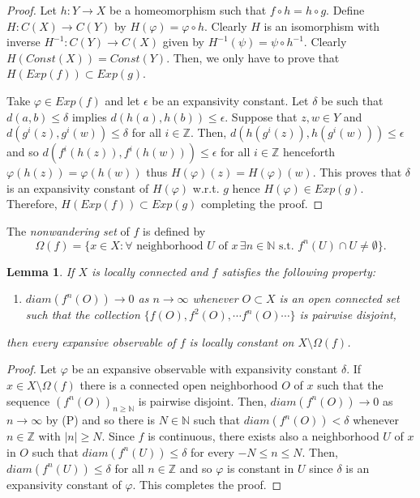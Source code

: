 \documentclass[11pt,letterpaper]{amsart}
\newtheorem{lem}{Lemma}
\begin{document}
\begin{proof}
Let $h:Y\to X$ be a homeomorphism such that
$f\circ h=h\circ g$.
Define $H:C(X)\to C(Y)$ by
$H(\varphi)=\varphi\circ h$.
Clearly $H$ is an isomorphism with inverse $H^{-1}:C(Y)\to C(X)$ given by $H^{-1}(\psi)=\psi\circ h^{-1}$.
Clearly $H(Const(X))=Const(Y)$.
Then, we only have to prove that $H(Exp(f))\subset Exp(g)$.

Take $\varphi\in Exp(f)$ and let $\epsilon$ be an expansivity constant.
Let $\delta$ be such that $d(a,b)\leq\delta$ implies
$d(h(a),h(b))\leq\epsilon$.
Suppose that $z,w\in Y$ and $d(g^i(z),g^i(w))\leq\delta$ for all $i\in\mathbb{Z}$.
Then, $d(h(g^i(z)),h(g^i(w)))\leq\epsilon$ and so
$d(f^i(h(z)),f^i(h(w)))\leq\epsilon$ for all $i\in\mathbb{Z}$
henceforth $\varphi(h(z))=\varphi(h(w))$ thus
$H(\varphi)(z)=H(\varphi)(w)$.
This proves that $\delta$ is an expansivity constant of $H(\varphi)$ w.r.t. $g$
hence $H(\varphi)\in Exp(g)$. Therefore, $H(Exp(f))\subset Exp(g)$ completing the proof.
\end{proof}

The {\em nonwandering set} of $f$ is defined by
$$
\Omega(f)=\{x\in X:\forall\mbox{ neighborhood }U \mbox{ of }x\, \exists n\in\mathbb{N}\mbox{ s.t. }f^n(U)\cap U\neq\emptyset\}.
$$





\begin{lem}
\label{ulrich}
If $X$ is locally connected and $f$ satisfies the following property:
\begin{enumerate}
\item[(P)]
$diam(f^n(O))\to0$ as $n\to\infty$ whenever $O\subset X$ is an open connected set such that the collection $\{f(O),f^2(O),\cdots f^n(O)\cdots\}$  is pairwise disjoint,
\end{enumerate}
then every expansive observable of $f$ is locally constant on $X\setminus \Omega(f)$.
\end{lem}


\begin{proof}
Let $\varphi$ be an expansive observable with expansivity constant $\delta$.
If $x\in X\setminus\Omega(f)$ there is a connected open neighborhood $O$ of $x$ such that the sequence $(f^n(O))_{n\geq\mathbb{N}}$ is pairwise disjoint.
Then,
$diam(f^n(O))\to 0$ as $n\to\infty$ by (P) and so there is $N\in\mathbb{N}$ such that
$diam(f^n(O))<\delta$ whenever $n\in\mathbb{Z}$ with $|n|\geq N$.
Since $f$ is continuous, there exists also a neighborhood $U$ of $x$ in $O$ such that
$diam(f^n(U))\leq \delta$ for every $-N\leq n\leq N$.
Then, $diam(f^n(U))\leq\delta$ for all $n\in\mathbb{Z}$ and so
$\varphi$ is constant in $U$ since $\delta$ is an expansivity constant of
$\varphi$. This completes the proof.
\end{proof}
\end{document}
